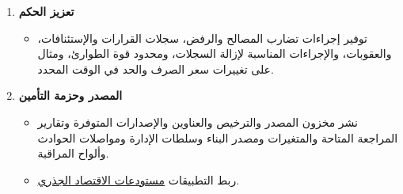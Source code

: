 \documentclass[11pt]{article}
\begin{document}
\begin{enumerate}[leftmargin=*]
\begin{itemize}[leftmargin=*]
\item ربط الفعالية \href{https://docs.cosmolocal.credit/ar/governance/terms}{Cosmo-Local Credit شروط الخدمة} والحفاظ على الإصدارات المستبدلة من خلال السجلات المراقبة.
\end{itemize}
\item \textbf{تعزيز الحكم}
\begin{itemize}[leftmargin=*]
\item توفير إجراءات تضارب المصالح والرفض، سجلات القرارات والإستئنافات، والعقوبات، والإجراءات المناسبة لإزالة السجلات، ومحدود قوة الطوارئ، ومثال على تغييرات سعر الصرف والحد في الوقت المحدد.
\end{itemize}
\item \textbf{المصدر وحزمة التأمين}
\begin{itemize}[leftmargin=*]
\item نشر مخزون المصدر والترخيص والعناوين والإصدارات المتوفرة وتقارير المراجعة المتاحة والمتغيرات ومصدر البناء وسلطات الإدارة ومواصلات الحوادث وألواح المراقبة.
\item ربط التطبيقات \href{https://github.com/grassrootseconomics}{مستودعات الاقتصاد الجذري}.
\end{itemize}
\end{enumerate}
\end{document}
